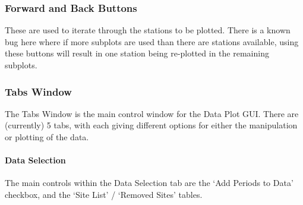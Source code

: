 \documentclass[letterpaper,10pt,english]{sphinxmanual}
\begin{document}
\begin{itemize}
\begin{description}
\begin{itemize}
\end{itemize}

\end{description}

\end{itemize}


\subsubsection{Forward and Back Buttons}
\label{\detokenize{content/data_plot/main_window:forward-and-back-buttons}}\label{\detokenize{content/data_plot/main_window:id2}}
\begin{figure}[htbp]
\centering

\noindent{}
\end{figure}

These are used to iterate through the stations to be plotted.
There is a known bug here where if more subplots are used than there are stations available, using these buttons will result in one station being re-plotted in the remaining subplots.


\subsubsection{Tabs Window}
\label{\detokenize{content/data_plot/main_window:tabs-window}}
\begin{figure}[htbp]
\centering

\noindent{}
\end{figure}

The Tabs Window is the main control window for the Data Plot GUI. There are (currently) 5 tabs, with each giving different options for either the manipulation or plotting of the data.


\paragraph{Data Selection}
\label{\detokenize{content/data_plot/main_window:data-selection}}
\begin{figure}[htbp]
\centering

\noindent{}
\end{figure}

The main controls within the Data Selection tab are the ‘Add Periods to Data’ checkbox, and the ‘Site List’ / ‘Removed Sites’ tables.
\end{document}
